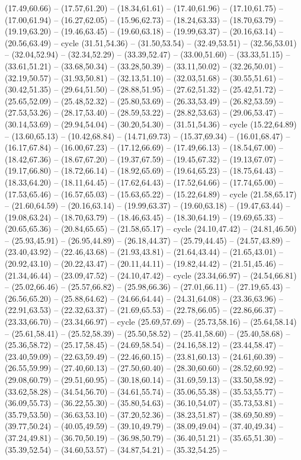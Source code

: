 {(17.49,60.66) -- (17.57,61.20) -- (18.34,61.61) -- (17.40,61.96) -- (17.10,61.75) -- (17.00,61.94) -- (16.27,62.05) -- (15.96,62.73) -- (18.24,63.33) -- (18.70,63.79) -- (19.19,63.20) -- (19.46,63.45) -- (19.60,63.18) -- (19.99,63.37) -- (20.16,63.14) -- (20.56,63.49) -- cycle (31.51,54.36) -- (31.50,53.54) -- (32.49,53.51) -- (32.56,53.01) -- (32.04,52.94) -- (32.34,52.29) -- (33.39,52.47) -- (33.00,51.60) -- (33.33,51.15) -- (33.61,51.21) -- (33.68,50.34) -- (33.28,50.39) -- (33.11,50.02) -- (32.26,50.01) -- (32.19,50.57) -- (31.93,50.81) -- (32.13,51.10) -- (32.03,51.68) -- (30.55,51.61) -- (30.42,51.35) -- (29.64,51.50) -- (28.88,51.95) -- (27.62,51.32) -- (25.42,51.72) -- (25.65,52.09) -- (25.48,52.32) -- (25.80,53.69) -- (26.33,53.49) -- (26.82,53.59) -- (27.53,53.26) -- (28.17,53.40) -- (28.59,53.22) -- (28.82,53.63) -- (29.06,53.47) -- (30.14,53.69) -- (29.94,54.04) -- (30.20,54.30) -- (31.51,54.36) -- cycle (15.22,64.89) -- (13.60,65.13) -- (10.42,68.84) -- (14.71,69.73) -- (15.37,69.34) -- (16.01,68.47) -- (16.17,67.84) -- (16.00,67.23) -- (17.12,66.69) -- (17.49,66.13) -- (18.54,67.00) -- (18.42,67.36) -- (18.67,67.20) -- (19.37,67.59) -- (19.45,67.32) -- (19.13,67.07) -- (19.17,66.80) -- (18.72,66.14) -- (18.92,65.69) -- (19.64,65.23) -- (18.75,64.43) -- (18.33,64.20) -- (18.11,64.45) -- (17.62,64.43) -- (17.52,64.66) -- (17.74,65.00) -- (17.53,65.46) -- (16.57,65.03) -- (15.63,65.22) -- (15.22,64.89) -- cycle (21.58,65.17) -- (21.60,64.59) -- (20.16,63.14) -- (19.99,63.37) -- (19.60,63.18) -- (19.47,63.44) -- (19.08,63.24) -- (18.70,63.79) -- (18.46,63.45) -- (18.30,64.19) -- (19.69,65.33) -- (20.65,65.36) -- (20.84,65.65) -- (21.58,65.17) -- cycle (24.10,47.42) -- (24.81,46.50) -- (25.93,45.91) -- (26.95,44.89) -- (26.18,44.37) -- (25.79,44.45) -- (24.57,43.89) -- (23.40,43.92) -- (22.46,43.68) -- (21.93,43.81) -- (21.64,43.44) -- (21.65,43.01) -- (20.92,43.10) -- (20.22,43.47) -- (20.11,44.11) -- (19.82,44.42) -- (21.51,45.46) -- (21.34,46.44) -- (23.09,47.52) -- (24.10,47.42) -- cycle (23.34,66.97) -- (24.54,66.81) -- (25.02,66.46) -- (25.57,66.82) -- (25.98,66.36) -- (27.01,66.11) -- (27.19,65.43) -- (26.56,65.20) -- (25.88,64.62) -- (24.66,64.44) -- (24.31,64.08) -- (23.36,63.96) -- (22.91,63.53) -- (22.32,63.37) -- (21.69,65.53) -- (22.78,66.05) -- (22.86,66.37) -- (23.33,66.70) -- (23.34,66.97) -- cycle (25.69,57.69) -- (25.73,58.16) -- (25.64,58.14) -- (25.61,58.41) -- (25.52,58.39) -- (25.50,58.52) -- (25.41,58.60) -- (25.40,58.68) -- (25.36,58.72) -- (25.17,58.45) -- (24.69,58.54) -- (24.16,58.12) -- (23.44,58.47) -- (23.40,59.09) -- (22.63,59.49) -- (22.46,60.15) -- (23.81,60.13) -- (24.61,60.39) -- (26.55,59.99) -- (27.40,60.13) -- (27.50,60.40) -- (28.30,60.60) -- (28.52,60.92) -- (29.08,60.79) -- (29.51,60.95) -- (30.18,60.14) -- (31.69,59.13) -- (33.50,58.92) -- (33.62,58.28) -- (34.54,56.70) -- (34.61,55.74) -- (35.06,55.38) -- (35.53,55.77) -- (36.09,55.73) -- (36.22,55.30) -- (35.80,54.63) -- (36.10,54.07) -- (35.73,53.81) -- (35.79,53.50) -- (36.63,53.10) -- (37.20,52.36) -- (38.23,51.87) -- (38.69,50.89) -- (39.77,50.24) -- (40.05,49.59) -- (39.10,49.79) -- (38.09,49.04) -- (37.40,49.34) -- (37.24,49.81) -- (36.70,50.19) -- (36.98,50.79) -- (36.40,51.21) -- (35.65,51.30) -- (35.39,52.54) -- (34.60,53.57) -- (34.87,54.21) -- (35.32,54.25) -- }
